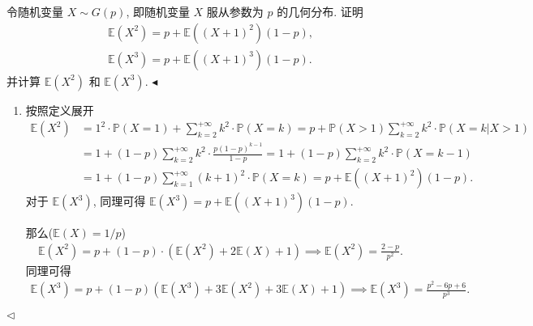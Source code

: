 \documentclass[11pt]{article}
\newenvironment{problem}[2][Problem]{\begin{trivlist}
    \item[\hskip \labelsep {\bfseries #1}\hskip \labelsep {\bfseries #2.}]\songti}{\hfill$\blacktriangleleft$\end{trivlist}}
\newenvironment{answer}[1][Solution]{\begin{trivlist}
    \item[\hskip \labelsep {\bfseries #1.}\hskip \labelsep]}{\hfill$\lhd$\end{trivlist}}
\newcommand\1{\mathds{1}}
\newcommand\E{\mathbb{E}}
\newcommand\PP{\mathbb{P}}
\begin{document}
\begin{problem}{3}
    令随机变量 $X \sim G(p)$, 即随机变量 $X$ 服从参数为 $p$ 的几何分布. 证明
    \begin{align*}
        \E\left(X^2\right) = p + \E\left((X+1)^2\right) (1-p), \\
        \E\left(X^3\right) = p + \E\left((X+1)^3\right) (1-p).
    \end{align*}
    并计算 $\E\left(X^2\right)$ 和 $\E\left(X^3\right)$.
\end{problem}
\begin{answer}
    \begin{enumerate}[label=(\arabic*)]
        \item 按照定义展开
        \begin{align*}
            \E\left(X^2\right) &= 1^2 \cdot \PP(X=1) + \sum_{k=2}^{+\infty} k^2 \cdot \PP(X=k) = p + \PP(X > 1) \sum_{k=2}^{+\infty} k^2 \cdot \PP(X=k|X>1) \\
            &= 1 + (1-p) \sum_{k=2}^{+\infty} k^2 \cdot \frac{p(1-p)^{k-1} }{1-p} = 1 + (1-p) \sum_{k=2}^{+\infty} k^2 \cdot \PP(X = k-1) \\
            &= 1 + (1-p) \sum_{k=1}^{+\infty} (k+1)^2 \cdot \PP(X = k) = p + \E\left((X+1)^2\right) (1-p).
        \end{align*}
        对于 $\E\left(X^3\right)$, 同理可得 $\E\left(X^3\right) = p + \E\left((X+1)^3\right) (1-p)$.

        那么($\E(X) = 1/p$)
        \begin{align*}
            \E\left(X^2\right) = p + (1-p) \cdot \left(\E\left(X^2\right) + 2\E(X) + 1  \right) \implies \E\left(X^2\right) = \frac{2-p}{p^2}.
        \end{align*}
        同理可得 
        \begin{align*}
            \E\left(X^3\right) = p + (1-p)\left(\E(X^3) + 3\E(X^2) + 3\E(X) + 1\right) \implies \E\left(X^3\right) = \frac{p^2-6p+6}{p^3}.
        \end{align*}
    \end{enumerate}
\end{answer}
\end{document}
